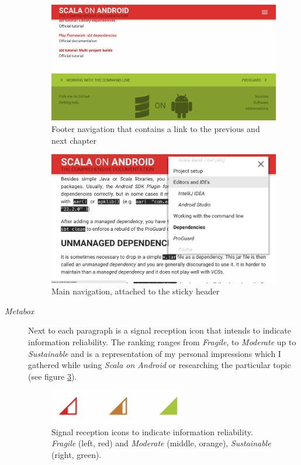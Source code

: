 \begin{description}
	\begin{figure}[]
		\includegraphics[width=\textwidth]{asset/story-telling.png}
		\caption{Footer navigation that contains a link to the previous and next chapter}
		\label{story-telling}
	\end{figure}

	\begin{figure}[]
		\includegraphics[width=\textwidth]{asset/navigation.png}
		\caption{Main navigation, attached to the sticky header}
		\label{navigation}
	\end{figure}

	\item[\textit{Metabox}]\hfill

	Next to each paragraph is a signal reception icon that intends to indicate information reliability. The ranking ranges from \textit{Fragile}, to \textit{Moderate} up to \textit{Sustainable} and is a representation of my personal impressions which I gathered while using \textit{Scala on Android} or researching the particular topic (see figure \ref{reception-icons}).

	\begin{figure}[]
		\center
		\includegraphics[width=6cm]{asset/reception-icons.png}
		\caption{Signal reception icons to indicate information reliability. \textit{Fragile} (left, red) and \textit{Moderate} (middle, orange), \textit{Sustainable} (right, green).}
		\label{reception-icons}
	\end{figure}


\end{description}
